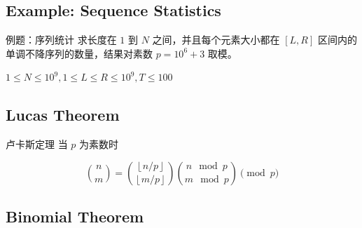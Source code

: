 \documentclass[12pt,aspectratio=169,handout]{beamer}
\begin{document}
\subsection[例题：序列统计]{Example: Sequence Statistics}

\begin{frame}[fragile]{例题：序列统计}
求长度在 $1$ 到 $N$ 之间，并且每个元素大小都在 $[L, R]$ 区间内的单调不降序列的数量，结果对素数 $p=10^6+3$ 取模。

$1 \le N \le 10^9, 1 \le L \le R \le 10^9, T \le 100$
\end{frame}








\subsection[卢卡斯定理]{Lucas Theorem}

\begin{frame}[fragile]{卢卡斯定理}
当 $p$ 为素数时

$$
{n \choose m} = {\left\lfloor n/p \right\rfloor \choose \left\lfloor m/p \right\rfloor} {n \mod p \choose m \mod p} \pmod{p}
$$
\end{frame}

\subsection[二项式定理]{Binomial Theorem}
\end{document}
